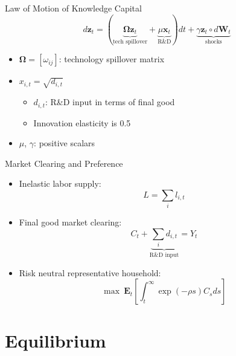 \documentclass[
  10pt,
  aspectratio=169,   %
  handout           %
]{beamer}
\theoremstyle{plain}
\begin{document}
\begin{frame}{Law of Motion of Knowledge Capital}
  \[
    d\bm{z}_{t}=\left(\underbrace{\bm{\Omega}\bm{z}_{t}}_{\text{tech spillover}}+\underbrace{\mu\bm{x}_{t}}_{\text{R\&D}}\right)dt+\underbrace{\gamma\bm{z}_{t} \circ d\bm{W}_{t}}_{\text{shocks}}
  \]
  \begin{itemize}
    \item $\bm{\Omega}=\left[\omega_{ij}\right]$: technology spillover matrix
    \medskip{}
    \item $x_{i,t}=\sqrt{d_{i,t}}$
    \begin{itemize}
      \item $d_{i,t}$: R\&D input in terms of final good
      \item Innovation elasticity is 0.5
      \medskip{}
    \end{itemize}
    \item $\mu$, $\gamma$: positive scalars
  \end{itemize}
\end{frame}

\begin{frame}{Market Clearing and Preference}
  \begin{itemize}
    \item Inelastic labor supply:
    \[
      L=\sum_{i}l_{i,t}
    \]
    \item Final good market clearing:
    \[
      C_{t}+\underbrace{\sum_{i}d_{i,t}}_{\text{R\&D input}}=Y_{t}
    \]
    \item Risk neutral representative household:
    \[
      \max\ \bm{E}_{t}\left[\int_{t}^{\infty}\exp\left(-\rho s\right)C_{s}ds\right]
    \]
  \end{itemize}
\end{frame}

\section{Equilibrium}
\end{document}
